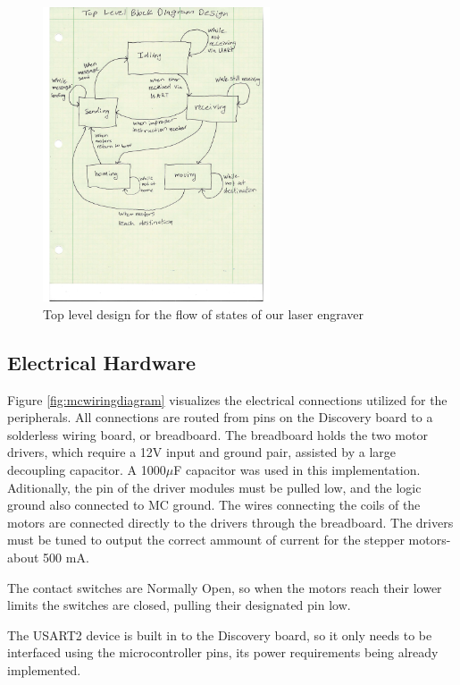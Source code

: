 \documentclass[11pt]{LaTeX-Classes/math-hw}
\begin{document}
 \begin{figure}[H]
   \begin{center}
     \includegraphics[width=0.6\textwidth]{blockdiagram}
     \caption{Top level design for the flow of states of our laser engraver}
     \label{fig:blockdiagram}
   \end{center}
 \end{figure}



\subsection{Electrical Hardware}
Figure \ref{fig:mcwiringdiagram} visualizes the electrical connections utilized for the peripherals.
All connections are routed from pins on the Discovery board to a solderless wiring board, or breadboard.
The breadboard holds the two motor drivers, which require a 12V input and ground pair,
assisted by a large decoupling capacitor. A 1000$\mu$F capacitor was used in this implementation.
Aditionally, the  pin of the driver modules must be pulled low, and the logic ground also
connected to MC ground. The wires connecting the coils of the motors are connected directly to the
drivers through the breadboard. The drivers must be tuned to output the correct ammount of current
for the stepper motors- about 500 mA. 

The contact switches are Normally Open, so when the motors reach their lower limits the switches
are closed, pulling their designated pin low.

The USART2 device is built in to the Discovery board, so it only needs to be interfaced using the
microcontroller pins, its power requirements being already implemented.
\end{document}
